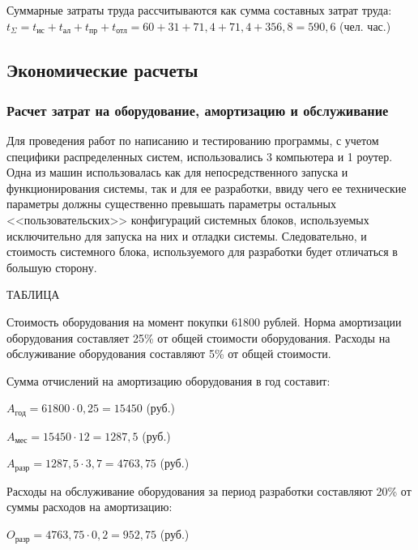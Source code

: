 Суммарные затраты труда рассчитываются как сумма составных затрат труда:
$ t_\Sigma = t_\text{ис} + t_\text{ал} + t_\text{пр} + t_\text{отл} = 60 + 31 + 71,4 + 71,4 + 356,8 = 590,6 $ (чел. час.)

\subsection{Экономические расчеты}
\subsubsection{Расчет затрат на оборудование, амортизацию и обслуживание}
Для проведения работ по написанию и тестированию программы, с учетом специфики распределенных систем, использовались 3 компьютера и 1 роутер. Одна из машин использовалась как для непосредственного запуска и функционирования системы, так и для ее разработки, ввиду чего ее технические параметры должны существенно превышать параметры остальных <<пользовательских>> конфигураций системных блоков, используемых исключительно для запуска на них и отладки системы. Следовательно, и стоимость системного блока, используемого для разработки будет отличаться в большую сторону.

ТАБЛИЦА

Стоимость оборудования на момент покупки 61800 рублей. Норма амортизации оборудования составляет 25\% от общей стоимости оборудования. Расходы на обслуживание оборудования составляют 5\% от общей стоимости.

Сумма отчислений на амортизацию оборудования в год составит:

\begin{center}
$ A_\text{год} = 61800 \cdot 0,25 = 15450 $ (руб.)
\end{center}

\begin{center}
$ A_\text{мес} = 15450 \cdot 12 = 1287,5 $ (руб.)
\end{center}

\begin{center}
$ A_\text{разр} = 1287,5 \cdot 3,7 = 4763,75 $ (руб.)
\end{center}

Расходы на обслуживание оборудования за период разработки составляют 20\% от суммы расходов на амортизацию:

\begin{center}
$ O_\text{разр} = 4763,75 \cdot 0,2 = 952,75 $ (руб.)
\end{center}

